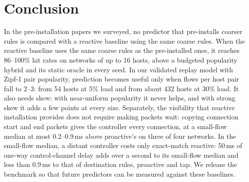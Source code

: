 \documentclass[sigconf]{acmart}
\begin{document}
\section{Conclusion}
In the pre-installation papers we surveyed, no predictor that pre-installs coarser rules is compared with a reactive baseline using the same coarse rules. When the reactive baseline uses the same coarse rules as the pre-installed ones, it reaches 86--100\% hit rates on networks of up to 16 hosts, above a budgeted popularity hybrid and its static oracle in every seed. In our validated replay model with Zipf-1 pair popularity, prediction becomes useful only when flows per host pair fall to 2--3: from 54 hosts at 5\% load and from about 432 hosts at 30\% load. It also needs skew: with near-uniform popularity it never helps, and with strong skew it adds a few points at every size. Separately, the visibility that reactive installation provides does not require making packets wait: copying connection start and end packets gives the controller every connection, at a small-flow median at most 0.2--0.9\,ms above proactive's on three of four networks. In the small-flow median, a distant controller costs only exact-match reactive: 50\,ms of one-way control-channel delay adds over a second to its small-flow median and less than 0.9\,ms to that of destination rules, proactive and tap. We release the benchmark so that future predictors can be measured against these baselines.
\end{document}
